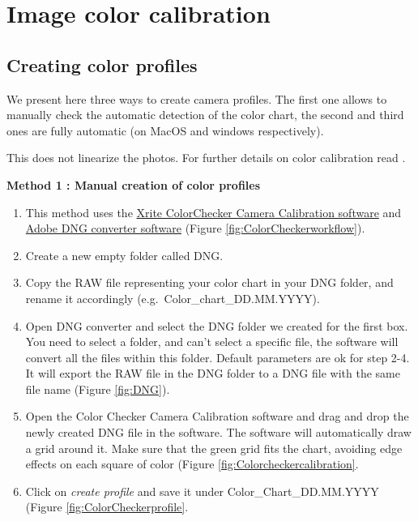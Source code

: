 \documentclass[
]{book}
\begin{document}
\hypertarget{image-color-calibration}{%
\section{Image color calibration}\label{image-color-calibration}}

\hypertarget{creating-color-profiles}{%
\subsection{Creating color profiles}\label{creating-color-profiles}}

We present here three ways to create camera profiles. The first one
allows to manually check the automatic detection of the color chart, the
second and third ones are fully automatic (on MacOS and windows
respectively).

This does not linearize the photos. For further details on color
calibration read \citep{troscianko2015image}.

\textbf{Method 1 : Manual creation of color profiles}

\begin{enumerate}
\def\labelenumi{\arabic{enumi}.}
\item
  This method uses the \href{https://xritephoto.com/ph_product_overview.aspx?ID=938\&Action=Support\&SoftwareID=2030}{Xrite ColorChecker Camera Calibration
  software}
  and \href{https://helpx.adobe.com/photoshop/using/adobe-dng-converter.html}{Adobe DNG converter
  software} (Figure \ref{fig:ColorCheckerworkflow}).
\item
  Create a new empty folder called DNG.
\item
  Copy the RAW file representing your color chart in your DNG folder,
  and rename it accordingly (e.g.~Color\_chart\_DD.MM.YYYY).
\item
  Open DNG converter and select the DNG folder we created for the
  first box. You need to select a folder, and can't select a specific
  file, the software will convert all the files within this folder.
  Default parameters are ok for step 2-4. It will export the RAW file
  in the DNG folder to a DNG file with the same file name (Figure \ref{fig:DNG}).
\item
  Open the Color Checker Camera Calibration software and drag and drop
  the newly created DNG file in the software. The software will
  automatically draw a grid around it. Make sure that the green grid
  fits the chart, avoiding edge effects on each square of color
  (Figure \ref{fig:Colorcheckercalibration}.
\item
  Click on \emph{create profile} and save it under Color\_Chart\_DD.MM.YYYY
  (Figure \ref{fig:ColorCheckerprofile}.
\end{enumerate}
\end{document}
